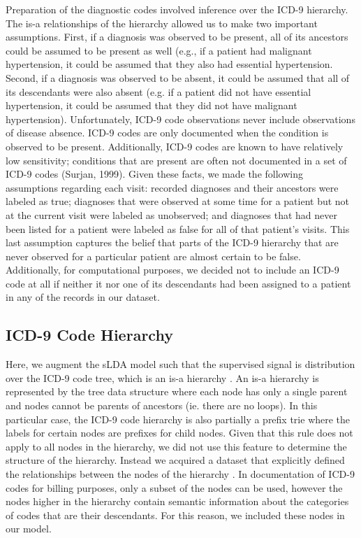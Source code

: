 \documentclass{article}
\begin{document}
Preparation of the diagnostic codes involved inference over the ICD-9
hierarchy. The is-a relationships of the hierarchy allowed us to make
two important assumptions. First, if a diagnosis was observed to be
present, all of its ancestors could be assumed to be present as well
(e.g., if a patient had malignant hypertension, it could be assumed
that they also had essential hypertension. Second, if a diagnosis
was observed to be absent, it could be assumed that all of its descendants
were also absent (e.g. if a patient did not have essential hypertension,
it could be assumed that they did not have malignant hypertension).
Unfortunately, ICD-9 code observations never include observations
of disease absence. ICD-9 codes are only documented when the condition
is observed to be present. Additionally, ICD-9 codes are known to
have relatively low sensitivity; conditions that are present are often
not documented in a set of ICD-9 codes (Surjan, 1999). Given these
facts, we made the following assumptions regarding each visit: recorded
diagnoses and their ancestors were labeled as true; diagnoses that
were observed at some time for a patient but not at the current visit
were labeled as unobserved; and diagnoses that had never been listed
for a patient were labeled as false for all of that patient\textquoteright{}s
visits. This last assumption captures the belief that parts of the
ICD-9 hierarchy that are never observed for a particular patient are
almost certain to be false. Additionally, for computational purposes,
we decided not to include an ICD-9 code at all if neither it nor one
of its descendants had been assigned to a patient in any of the records
in our dataset.


\subsection{ICD-9 Code Hierarchy}

Here, we augment the sLDA model such that the supervised signal is
distribution over the ICD-9 code tree, which is an is-a hierarchy
\citep{ICD9NCBO}. An is-a hierarchy is represented by the tree data
structure where each node has only a single parent and nodes cannot
be parents of ancestors (ie. there are no loops). In this particular
case, the ICD-9 code hierarchy is also partially a prefix trie where
the labels for certain nodes are prefixes for child nodes. Given that
this rule does not apply to all nodes in the hierarchy, we did not
use this feature to determine the structure of the hierarchy. Instead
we acquired a dataset that explicitly defined the relationships between
the nodes of the hierarchy \citep{ICD9NCBO}. In documentation of
ICD-9 codes for billing purposes, only a subset of the nodes can be
used, however the nodes higher in the hierarchy contain semantic information
about the categories of codes that are their descendants. For this
reason, we included these nodes in our model.
\end{document}
